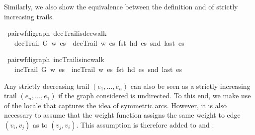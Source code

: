 \begin{isabellebody}
\begin{isamarkuptext}
Similarly, we also show the equivalence between the definition  and  of strictly increasing trails.%
\end{isamarkuptext}\isamarkuptrue%
\isamarkupfalse%
{\isacharparenleft}\ pair{\isacharunderscore}wf{\isacharunderscore}digraph{\isacharparenright}\ decTrail{\isacharunderscore}is{\isacharunderscore}dec{\isacharunderscore}walk{\isacharcolon}\isanewline
\ \ \ {\isachardoublequoteopen}decTrail\ G\ w\ es\ {\isasymlongleftrightarrow}\ decTrail{}\ w\ es\ {\isacharparenleft}fst\ {\isacharparenleft}hd\ es{\isacharparenright}{\isacharparenright}\ {\isacharparenleft}snd\ {\isacharparenleft}last\ es{\isacharparenright}{\isacharparenright}{\isachardoublequoteclose}%
\isadelimproof
%
\endisadelimproof
%
\isatagproof
%
\endisatagproof
{\isafoldproof}%
%
\isadelimproof
%
\endisadelimproof
%
\begin{isamarkuptext}%
%
\end{isamarkuptext}\isamarkuptrue%
\isamarkupfalse%
{\isacharparenleft}\ pair{\isacharunderscore}wf{\isacharunderscore}digraph{\isacharparenright}\ incTrail{\isacharunderscore}is{\isacharunderscore}inc{\isacharunderscore}walk{\isacharcolon}\isanewline
\ \ \ {\isachardoublequoteopen}incTrail\ G\ w\ es\ {\isasymlongleftrightarrow}\ incTrail{}\ w\ es\ {\isacharparenleft}fst\ {\isacharparenleft}hd\ es{\isacharparenright}{\isacharparenright}\ {\isacharparenleft}snd\ {\isacharparenleft}last\ es{\isacharparenright}{\isacharparenright}{\isachardoublequoteclose}%
\isadelimproof
%
\endisadelimproof
%
\isatagproof
%
\endisatagproof
{\isafoldproof}%
%
\isadelimproof
%
\endisadelimproof
%
\isadelimproof
%
\endisadelimproof
%
\isatagproof
%
\endisatagproof
{\isafoldproof}%
%
\isadelimproof
%
\endisadelimproof
%
\isadelimproof
%
\endisadelimproof
%
\isatagproof
%
\endisatagproof
{\isafoldproof}%
%
\isadelimproof
%
\endisadelimproof
%
\begin{isamarkuptext}%
Any strictly decreasing trail $(e_1,\ldots,e_n)$ can also be seen as a strictly increasing trail $(e_n,...,e_1)$
if the graph considered is undirected. To this end, we make use of the locale 
that captures the idea of symmetric arcs. However, it is also necessary to assume that the weight 
function assigns the same weight to edge $(v_i,v_j)$ as to $(v_j,v_i)$. This assumption is therefore
added to  and .%

\end{isamarkuptext}
\end{isabellebody}
